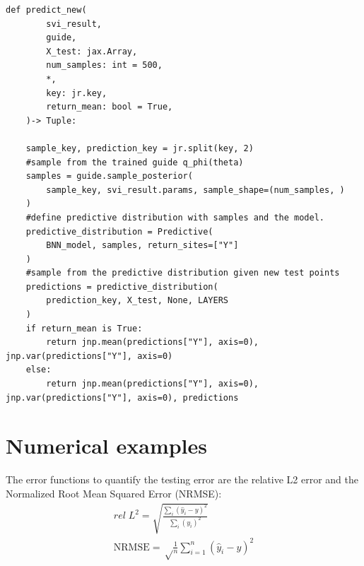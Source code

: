 \documentclass{article}
\begin{document}
\begin{lstlisting}[caption={Prediction of new samples with VI},captionpos=t]
def predict_new(
        svi_result,
        guide,
        X_test: jax.Array,
        num_samples: int = 500,
        *,
        key: jr.key,
        return_mean: bool = True,
    )-> Tuple:
    
    sample_key, prediction_key = jr.split(key, 2)
    #sample from the trained guide q_phi(theta)
    samples = guide.sample_posterior(
        sample_key, svi_result.params, sample_shape=(num_samples, )
    )
    #define predictive distribution with samples and the model.
    predictive_distribution = Predictive(
        BNN_model, samples, return_sites=["Y"]
    )
    #sample from the predictive distribution given new test points
    predictions = predictive_distribution(
        prediction_key, X_test, None, LAYERS
    )
    if return_mean is True:
        return jnp.mean(predictions["Y"], axis=0), jnp.var(predictions["Y"], axis=0)
    else:
        return jnp.mean(predictions["Y"], axis=0), jnp.var(predictions["Y"], axis=0), predictions
\end{lstlisting}

\section{Numerical examples}
The error functions to quantify the testing error are the relative L2 error and the Normalized Root Mean Squared Error (NRMSE):
\begin{align}
     rel \; L^2 = \sqrt{\frac{\sum_i (\hat{y}_i - y)^2}{\sum_i (y_i)^2}}\\
    \text{NRMSE} = \sqrt \tfrac{1}{n}\sum_{i=1}^n (\hat{y}_i - y)^2
\end{align}
\end{document}
